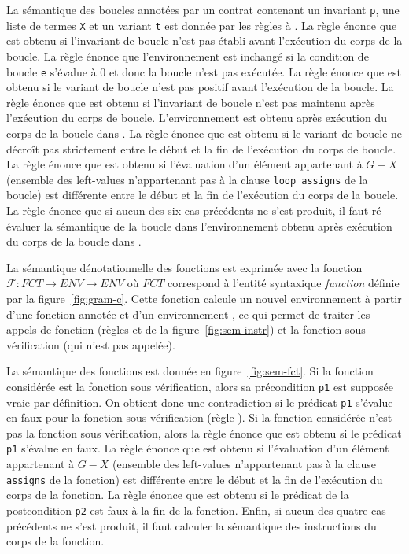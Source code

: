 La sémantique des boucles annotées par un contrat contenant un invariant
\lstinline'p', une liste de termes \lstinline'X' et un variant \lstinline't' est
donnée par les règles  à .
La règle  énonce que \errorenv est obtenu si l'invariant de
boucle n'est pas établi avant l'exécution du corps de la boucle.
La règle  énonce que l'environnement \env est inchangé si
la condition de boucle \lstinline'e' s'évalue à 0 et donc la boucle n'est pas
exécutée.
La règle  énonce que \errorenv est obtenu si le variant de
boucle n'est pas positif avant l'exécution de la boucle.
La règle  énonce que \errorenv est obtenu si l'invariant de
boucle n'est pas maintenu après l'exécution du corps de boucle.
L'environnement  est obtenu après exécution du
corps de la boucle dans \env.
La règle  énonce que \errorenv est obtenu si le variant de
boucle ne décroît pas strictement entre le début et la fin de l'exécution du
corps de boucle.
La règle  énonce que \errorenv est obtenu si l'évaluation
d'un élément appartenant à $G-X$ (ensemble des left-values n'appartenant pas à
la clause \lstinline'loop assigns' de la boucle) est différente entre le début
et la fin de l'exécution du corps de la boucle.
La règle  énonce que si aucun des six cas précédents ne s'est
produit, il faut ré-évaluer la sémantique de la boucle dans l'environnement
obtenu après exécution du corps de la boucle dans \env.





La sémantique dénotationnelle des fonctions est exprimée avec la fonction
$\mathcal{F} : FCT \rightarrow ENV \rightarrow ENV$ où $FCT$ correspond à
l'entité syntaxique \textit{function} définie par la figure~\ref{fig:gram-c}.
Cette fonction calcule un nouvel environnement à partir d'une
fonction annotée et d'un environnement \env, ce qui permet de traiter les appels
de fonction (règles  et  de la
figure~\ref{fig:sem-instr}) et la fonction sous vérification (qui n'est pas
appelée).

La sémantique des fonctions est donnée en figure~\ref{fig:sem-fct}.
Si la fonction considérée est la fonction sous vérification, alors sa
précondition \lstinline'p1' est supposée vraie par définition.
On obtient donc une contradiction si le prédicat \lstinline'p1' s'évalue en
faux pour la fonction sous vérification (règle ).
Si la fonction considérée n'est pas la fonction sous vérification, alors la
règle  énonce que \errorenv est obtenu si le prédicat
\lstinline'p1' s'évalue en faux.
La règle  énonce que \errorenv est obtenu si l'évaluation
d'un élément appartenant à $G-X$ (ensemble des left-values n'appartenant pas à
la clause \lstinline'assigns' de la fonction) est différente entre le début
et la fin de l'exécution du corps de la fonction.
La règle  énonce que \errorenv est obtenu si le prédicat de la
postcondition \lstinline'p2' est faux à la fin de la fonction.
Enfin, si aucun des quatre cas précédents ne s'est produit, il faut calculer la
sémantique des instructions du corps de la fonction.


